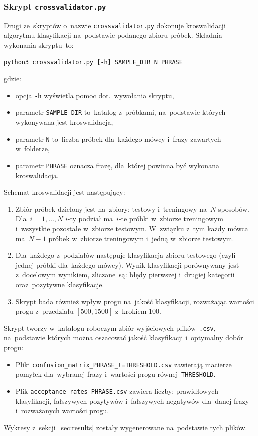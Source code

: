 \documentclass[11pt,a4paper]{article}
\begin{document}
\subsubsection{Skrypt \texttt{crossvalidator.py}}
\label{subsubsec:crossvalidator}

Drugi ze~skryptów o~nazwie \texttt{crossvalidator.py} dokonuje kroswalidacji algorytmu klasyfikacji na~podstawie podanego zbioru próbek.
Składnia wykonania skryptu~to:
\begin{verbatim}
python3 crossvalidator.py [-h] SAMPLE_DIR N PHRASE
\end{verbatim}
gdzie:
\begin{itemize}
    \item opcja \texttt{-h} wyświetla pomoc dot.~wywołania skryptu,
    \item parametr \texttt{SAMPLE\_DIR} to~katalog z~próbkami, na~podstawie których wykonywana jest kroswalidacja,
    \item parametr \texttt{N} to~liczba próbek dla~każdego mówcy i~frazy zawartych w~folderze,
    \item parametr \texttt{PHRASE} oznacza frazę, dla~której powinna być wykonana kroswalidacja.
\end{itemize}
Schemat kroswalidacji jest następujący:
\begin{enumerate}
    \item Zbiór próbek dzielony jest na~zbiory: testowy i~treningowy na~$N$ sposobów.
        Dla~$i = 1, \dots, N$ $i$-ty podział ma~$i$-te próbki w~zbiorze treningowym i~wszystkie pozostałe w~zbiorze testowym.
        W~związku z~tym każdy mówca ma~$N - 1$ próbek w~zbiorze treningowym i~jedną w~zbiorze testowym.
    \item Dla~każdego z~podziałów następuje klasyfikacja zbioru testowego (czyli jednej próbki dla~każdego mówcy).
        Wynik klasyfikacji porównywany jest z~docelowym wynikiem, zliczane~są: błędy pierwszej i~drugiej kategorii oraz~pozytywne klasyfikacje.
    \item Skrypt bada również wpływ progu na~jakość klasyfikacji, rozważając wartości progu z~przedziału $[500, 1500]$ z~krokiem 100.
\end{enumerate}
Skrypt tworzy w~katalogu roboczym zbiór wyjściowych plików~\texttt{.csv}, na~podstawie których można oszacować jakość klasyfikacji i~optymalny dobór progu:
\begin{itemize}
    \item Pliki \texttt{confusion\_matrix\_PHRASE\_t=THRESHOLD.csv} zawierają macierze pomyłek dla~wybranej frazy i~wartości progu równej~\texttt{THRESHOLD}.
    \item Plik \texttt{acceptance\_rates\_PHRASE.csv} zawiera liczby: prawidłowych klasyfikacji, fałszywych pozytywów i~fałszywych negatywów dla~danej frazy i~rozważanych wartości progu.
\end{itemize}
Wykresy z~sekcji~\ref{sec:results} zostały wygenerowane na~podstawie tych plików.
\end{document}
